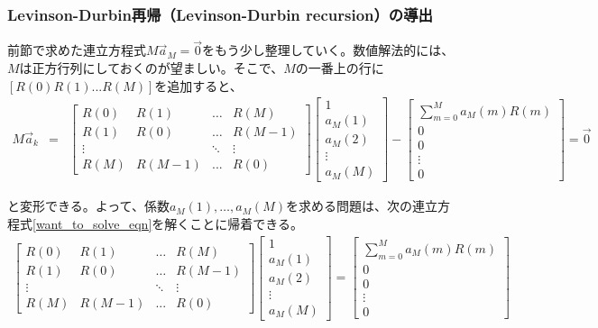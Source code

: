 \documentclass[uplatex,dvipdfmx,b5j,10pt]{jsbook}
\theoremstyle{definition}
\begin{document}
\subsubsection{Levinson-Durbin再帰（Levinson-Durbin recursion）の導出}

前節で求めた連立方程式$M\vec{a}_{M} = \vec{0}$をもう少し整理していく。数値解法的には、$M$は正方行列にしておくのが望ましい。そこで、$M$の一番上の行に$[R(0) R(1) ... R(M)]$を追加すると、
\begin{eqnarray*}
  M\vec{a}_{k} &=& 
  \begin{bmatrix}
    R(0) & R(1) & \dots & R(M)   \\
    R(1) & R(0) & \dots & R(M-1) \\
    \vdots &       & \ddots   & \vdots  \\
    R(M) & R(M-1) & ... & R(0)
  \end{bmatrix}
  \begin{bmatrix}
    1 \\ a_{M}(1) \\ a_{M}(2) \\ \vdots \\ a_{M}(M)
  \end{bmatrix}
  -\begin{bmatrix}
    \sum_{m=0}^{M}a_{M}(m)R(m) \\ 0 \\ 0 \\ \vdots \\ 0 
  \end{bmatrix}
  = \vec{0}
\end{eqnarray*}

と変形できる。よって、係数$a_{M}(1), \dots, a_{M}(M)$を求める問題は、次の連立方程式\ref{want_to_solve_eqn}を解くことに帰着できる。
\begin{eqnarray}
  \begin{bmatrix}
    R(0) & R(1) & \dots & R(M)   \\
    R(1) & R(0) & \dots & R(M-1) \\
    \vdots &       & \ddots   & \vdots  \\
    R(M) & R(M-1) & ... & R(0)
  \end{bmatrix}
  \begin{bmatrix}
    1 \\ a_{M}(1) \\ a_{M}(2) \\ \vdots \\ a_{M}(M)
  \end{bmatrix}
  =\begin{bmatrix}
    \sum_{m=0}^{M}a_{M}(m)R(m) \\ 0 \\ 0 \\ \vdots \\ 0 \label{want_to_solve_eqn}
  \end{bmatrix}
\end{eqnarray}
\end{document}
